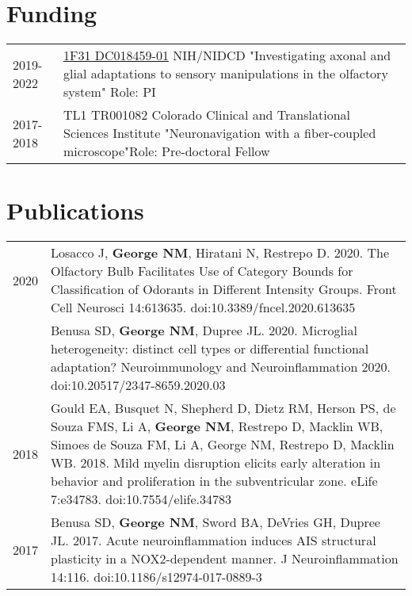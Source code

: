 \documentclass[11pt]{article}
\begin{document}
\section*{Funding}
\label{sec:org13919ae}
\begin{tabular}{lp{}}
2019-2022& \href{https://projectreporter.nih.gov/project_info_details.cfm?aid=9909888&icde=50328886&ddparam=&ddvalue=&ddsub=&cr=1&csb=default&cs=ASC&pball=}{1F31 DC018459-01} \newline NIH/NIDCD \newline "Investigating axonal and glial adaptations to sensory manipulations in the olfactory system" \newline Role: PI \\
2017-2018& TL1 TR001082 \newline Colorado Clinical and Translational Sciences Institute \newline "Neuronavigation with a fiber-coupled microscope"\newline Role: Pre-doctoral Fellow
\end{tabular}

\section*{Publications}
\label{sec:orgd761a94}
\begin{tabular}{lp{}}
2020& Losacco J, \textbf{George NM}, Hiratani N, Restrepo D. 2020. The Olfactory Bulb Facilitates Use of Category Bounds for Classification of Odorants in Different Intensity Groups. Front Cell Neurosci 14:613635. doi:10.3389/fncel.2020.613635\\

& Benusa SD, \textbf{George NM}, Dupree JL. 2020. Microglial heterogeneity: distinct cell types or differential functional adaptation? Neuroimmunology and Neuroinflammation 2020. doi:10.20517/2347-8659.2020.03\\

2018& Gould EA, Busquet N, Shepherd D, Dietz RM, Herson PS, de Souza FMS, Li A, \textbf{George NM}, Restrepo D, Macklin WB, Simoes de Souza FM, Li A, George NM, Restrepo D, Macklin WB. 2018. Mild myelin disruption elicits early alteration in behavior and proliferation in the subventricular zone. eLife 7:e34783. doi:10.7554/elife.34783\\

2017& Benusa SD, \textbf{George NM}, Sword BA, DeVries GH, Dupree JL. 2017. Acute neuroinflammation induces AIS structural plasticity in a NOX2-dependent manner. J Neuroinflammation 14:116. doi:10.1186/s12974-017-0889-3\\

\end{tabular}
\end{document}
